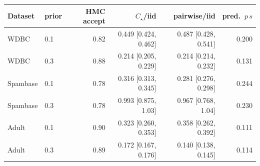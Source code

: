 \begin{tabular}{llrrrr}
\toprule
Dataset & prior & HMC accept & $C_\star$/iid & pairwise/iid & pred.\ $p\,s$ \\
\midrule
WDBC & 0.1 & 0.82 & 0.449 [0.424, 0.462] & 0.487 [0.428, 0.541] & 0.200 \\
WDBC & 0.3 & 0.88 & 0.214 [0.205, 0.229] & 0.214 [0.214, 0.232] & 0.131 \\
Spambase & 0.1 & 0.78 & 0.316 [0.313, 0.345] & 0.281 [0.276, 0.298] & 0.244 \\
Spambase & 0.3 & 0.78 & 0.993 [0.875, 1.03] & 0.967 [0.768, 1.04] & 0.230 \\
Adult & 0.1 & 0.90 & 0.323 [0.260, 0.353] & 0.358 [0.262, 0.392] & 0.111 \\
Adult & 0.3 & 0.89 & 0.172 [0.167, 0.176] & 0.140 [0.138, 0.145] & 0.114 \\
\bottomrule
\end{tabular}
